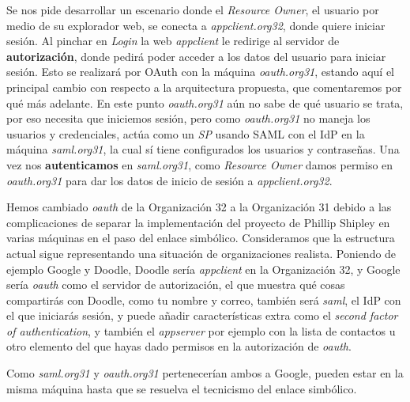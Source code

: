 \documentclass[]{article}
\begin{document}
Se nos pide desarrollar un escenario donde el \textit{Resource Owner}, el usuario por medio de su explorador web, se conecta a \textit{appclient.org32},
donde quiere iniciar sesión. Al pinchar en \textit{Login} la web \textit{appclient} le redirige al servidor de \textbf{autorización}, donde pedirá poder acceder
a los datos del usuario para iniciar sesión. Esto se realizará por OAuth con la máquina \textit{oauth.org31}, estando aquí el principal cambio con respecto
a la arquitectura propuesta, que comentaremos por qué más adelante. En este punto \textit{oauth.org31} aún no sabe de qué usuario se trata, por eso necesita que
iniciemos sesión, pero como \textit{oauth.org31} no maneja los usuarios y credenciales, actúa como un \textit{SP} usando SAML con el IdP en la máquina \textit{saml.org31},
la cual sí tiene configurados los usuarios y contraseñas. Una vez nos \textbf{autenticamos} en \textit{saml.org31}, como \textit{Resource Owner} damos permiso en
\textit{oauth.org31} para dar los datos de inicio de sesión a \textit{appclient.org32}.


\hfill

Hemos cambiado \textit{oauth} de la Organización 32 a la Organización 31 debido a las complicaciones de separar la implementación del proyecto de Phillip Shipley en varias máquinas
en el paso del enlace simbólico. Consideramos que la estructura actual sigue representando una situación de organizaciones realista. Poniendo de ejemplo Google y Doodle,
Doodle sería \textit{appclient} en la Organización 32, y Google sería \textit{oauth} como el servidor de autorización, el que muestra qué cosas compartirás con Doodle, como tu nombre y correo,
también será \textit{saml}, el IdP con el que iniciarás sesión, y puede añadir características extra como el \textit{second factor of authentication}, y también el \textit{appserver} por ejemplo
con la lista de contactos u otro elemento del que hayas dado permisos en la autorización de \textit{oauth}.

Como \textit{saml.org31} y \textit{oauth.org31} pertenecerían ambos a Google, pueden estar en la misma máquina hasta que se resuelva el tecnicismo del enlace simbólico.

\hfill
\end{document}
